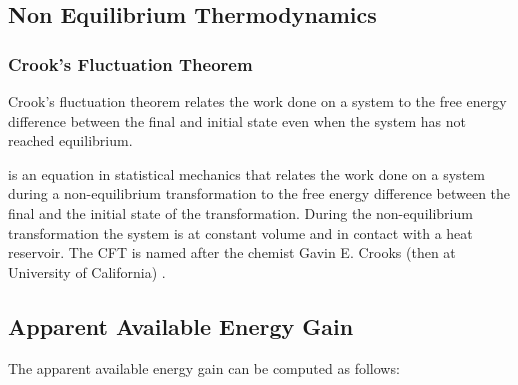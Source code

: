\subsection{Non Equilibrium Thermodynamics}\label{non-equilibrium-thermodynamics}

\subsubsection{Crook's Fluctuation Theorem}\label{crooks-fluctuation-theorem}

Crook's fluctuation theorem \cite{Crooks-fluctuation99} relates the work
done on a system to the free energy difference between the final and
initial state even when the system has not reached equilibrium.

is an equation in statistical mechanics that relates the work done on a
system during a non-equilibrium transformation to the free energy
difference between the final and the initial state of the
transformation. During the non-equilibrium transformation the system is
at constant volume and in contact with a heat reservoir. The CFT is
named after the chemist Gavin E. Crooks (then at University of
California) \cite{Crooks-fluctuation99}.



\appendix

\subsection{Apparent Available Energy Gain}\label{sec-apparent-available-energy-gain}

The apparent available energy gain can be computed as follows:

